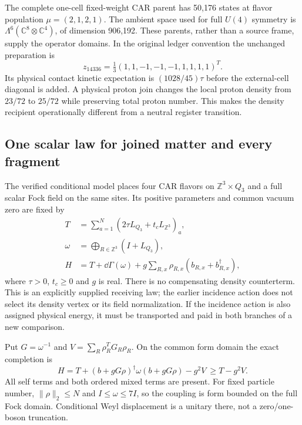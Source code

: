 The complete one-cell fixed-weight CAR parent has 50,176 states at flavor
population $\mu=(2,1,2,1)$. The ambient space used for full $U(4)$ symmetry
is $\Lambda^6(\mathbb C^8\otimes\mathbb C^4)$, of dimension 906,192.
These parents, rather than a source frame, supply the operator domains.
In the original ledger convention the unchanged preparation is
\begin{equation}
z_{14336}=\tfrac13(1,1,-1,-1,-1,1,1,1,1)^T.
\end{equation}
Its physical contact kinetic expectation is $(1028/45)\tau$ before the
external-cell diagonal is added. A physical proton join changes the local
proton density from $23/72$ to $25/72$ while preserving total proton number.
This makes the density recipient operationally different from a neutral
register transition.

\subsection{One scalar law for joined matter and every fragment}
\label{sec:scalar-law-new}

The verified conditional model places four CAR flavors on
$\mathbb Z^3\times Q_3$ and a full scalar Fock field on the same sites. Its
positive parameters and common vacuum zero are fixed by
\begin{align}
T&=\sum_{a=1}^{N}(2\tau L_{Q_3}+t_cL_{\mathbb Z^3})_a,\\
\omega&=\bigoplus_{R\in\mathbb Z^3}(I+L_{Q_3}),\\
H&=T+\dd\Gamma(\omega)
 +g\sum_{R,x}\rho_{R,x}(b_{R,x}+b_{R,x}^\dagger),
\label{eq:scalar-law-new}
\end{align}
where $\tau>0$, $t_c\geq0$ and $g$ is real. There is no compensating
density counterterm. This is an explicitly supplied receiving law; the
earlier incidence action does not select its density vertex or its field
normalization. If the incidence action is also assigned physical energy,
it must be transported and paid in both branches of a new comparison.

Put $G=\omega^{-1}$ and $V=\sum_R\rho_R^TG_R\rho_R$. On the common form
domain the exact completion is
\begin{equation}
H=T+(b+gG\rho)^\dagger\omega(b+gG\rho)-g^2V
\ \geq T-g^2V.
\label{eq:full-square-new}
\end{equation}
All self terms and both ordered mixed terms are present. For fixed particle
number, $\|\rho\|_2\leq N$ and $I\leq\omega\leq7I$, so the coupling is
form bounded on the full Fock domain. Conditional Weyl displacement is a
unitary there, not a zero/one-boson truncation.

